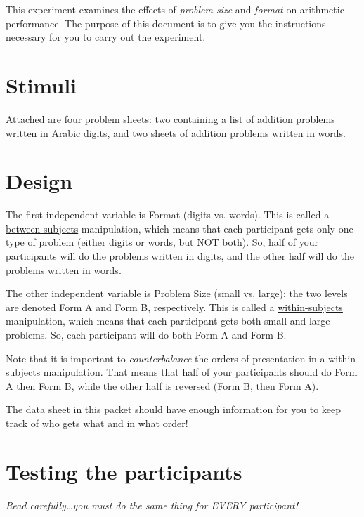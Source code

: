 \documentclass[11pt]{article}
\begin{document}
This experiment examines the effects of \emph{problem size} and \emph{format} on arithmetic performance.  The purpose of this document is to give you the instructions necessary for you to carry out the experiment.

\section*{Stimuli}
Attached are four problem sheets: two containing a list of addition problems written in Arabic digits, and two sheets of addition problems written in words.

\section*{Design}
The first independent variable is Format (digits vs. words).  This is called a \underline{between-subjects} manipulation, which means that each participant gets only one type of problem (either digits or words, but NOT both).  So, half of your participants will do the problems written in digits, and the other half will do the problems written in words.

The other independent variable is Problem Size (small vs. large); the two levels are denoted Form A and Form B, respectively.  This is called a \underline{within-subjects} manipulation, which means that each participant gets both small and large problems.  So, each participant will do both Form A and Form B.

Note that it is important to \emph{counterbalance} the orders of presentation in a within-subjects manipulation.  That means that half of your participants should do Form A then Form B, while the other half is reversed (Form B, then Form A).  

The data sheet in this packet should have enough information for you to keep track of who gets what and in what order!

\section*{Testing the participants}

\emph{Read carefully\ldots{}you must do the same thing for EVERY participant!}
\end{document}
